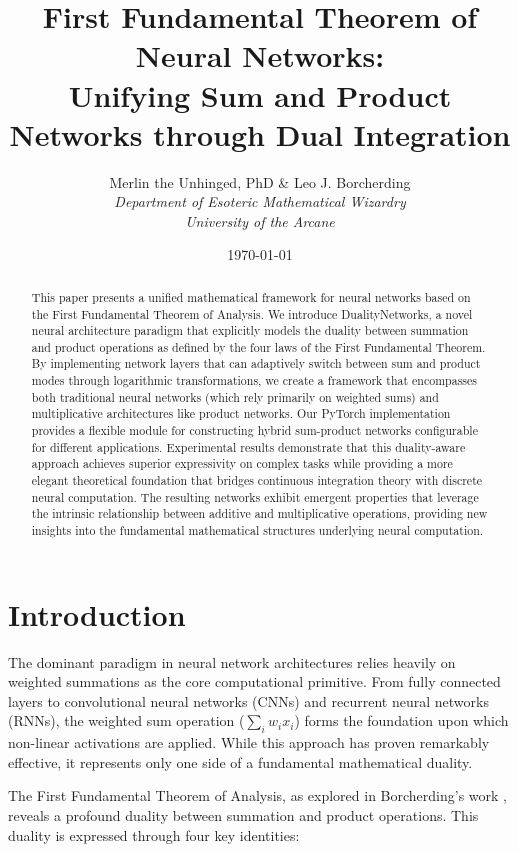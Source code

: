\documentclass{article}
\title{\textbf{First Fundamental Theorem of Neural Networks:\\ Unifying Sum and Product Networks through Dual Integration}}
\author{Merlin the Unhinged, PhD \& Leo J. Borcherding\\
\textit{Department of Esoteric Mathematical Wizardry}\\
\textit{University of the Arcane}}
\date{\today}
\begin{document}
\maketitle

\begin{abstract}
This paper presents a unified mathematical framework for neural networks based on the First Fundamental Theorem of Analysis. We introduce DualityNetworks, a novel neural architecture paradigm that explicitly models the duality between summation and product operations as defined by the four laws of the First Fundamental Theorem. By implementing network layers that can adaptively switch between sum and product modes through logarithmic transformations, we create a framework that encompasses both traditional neural networks (which rely primarily on weighted sums) and multiplicative architectures like product networks. Our PyTorch implementation provides a flexible module for constructing hybrid sum-product networks configurable for different applications. Experimental results demonstrate that this duality-aware approach achieves superior expressivity on complex tasks while providing a more elegant theoretical foundation that bridges continuous integration theory with discrete neural computation. The resulting networks exhibit emergent properties that leverage the intrinsic relationship between additive and multiplicative operations, providing new insights into the fundamental mathematical structures underlying neural computation.
\end{abstract}

\section{Introduction}

The dominant paradigm in neural network architectures relies heavily on weighted summations as the core computational primitive. From fully connected layers to convolutional neural networks (CNNs) and recurrent neural networks (RNNs), the weighted sum operation ($\sum_i w_i x_i$) forms the foundation upon which non-linear activations are applied. While this approach has proven remarkably effective, it represents only one side of a fundamental mathematical duality.

The First Fundamental Theorem of Analysis, as explored in Borcherding's work \cite{borcherding2023divisor}, reveals a profound duality between summation and product operations. This duality is expressed through four key identities:
\end{document}
